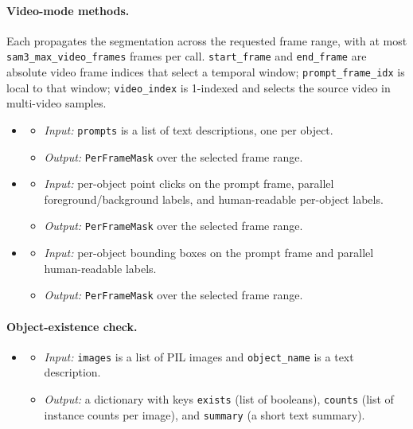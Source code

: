 \paragraph{Video-mode methods.} Each propagates the segmentation across the requested frame range, with at most \texttt{sam3\_max\_video\_frames} frames per call. \texttt{start\_frame} and \texttt{end\_frame} are absolute video frame indices that select a temporal window; \texttt{prompt\_frame\_idx} is local to that window; \texttt{video\_index} is 1-indexed and selects the source video in multi-video samples.
\begin{itemize}[leftmargin=1.5em]
\item {}
  \begin{itemize}
  \item \emph{Input:} \texttt{prompts} is a list of text descriptions, one per object.
  \item \emph{Output:} \texttt{PerFrameMask} over the selected frame range.
  \end{itemize}
\item {}
  \begin{itemize}
  \item \emph{Input:} per-object point clicks on the prompt frame, parallel foreground/background labels, and human-readable per-object labels.
  \item \emph{Output:} \texttt{PerFrameMask} over the selected frame range.
  \end{itemize}
\item {}
  \begin{itemize}
  \item \emph{Input:} per-object bounding boxes on the prompt frame and parallel human-readable labels.
  \item \emph{Output:} \texttt{PerFrameMask} over the selected frame range.
  \end{itemize}
\end{itemize}

\paragraph{Object-existence check.}
\begin{itemize}[leftmargin=1.5em]
\item {}
  \begin{itemize}
  \item \emph{Input:} \texttt{images} is a list of PIL images and \texttt{object\_name} is a text description.
  \item \emph{Output:} a dictionary with keys \texttt{exists} (list of booleans), \texttt{counts} (list of instance counts per image), and \texttt{summary} (a short text summary).
  \end{itemize}
\end{itemize}


